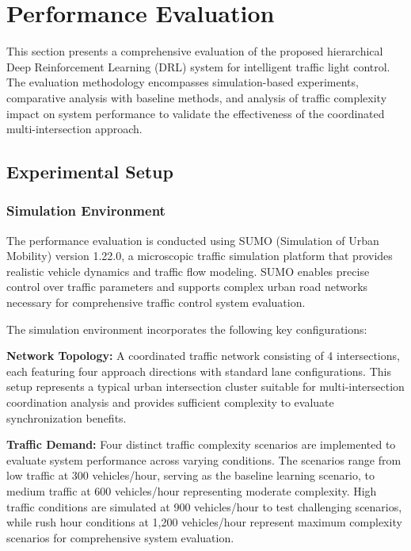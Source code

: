 \section{Performance Evaluation}\label{sec2b}

This section presents a comprehensive evaluation of the proposed hierarchical Deep Reinforcement Learning (DRL) system for intelligent traffic light control. The evaluation methodology encompasses simulation-based experiments, comparative analysis with baseline methods, and analysis of traffic complexity impact on system performance to validate the effectiveness of the coordinated multi-intersection approach.

\subsection{Experimental Setup}\label{subsec2b-1}

\subsubsection{Simulation Environment}

The performance evaluation is conducted using SUMO (Simulation of Urban Mobility) version 1.22.0, a microscopic traffic simulation platform that provides realistic vehicle dynamics and traffic flow modeling. SUMO enables precise control over traffic parameters and supports complex urban road networks necessary for comprehensive traffic control system evaluation.

The simulation environment incorporates the following key configurations:

\textbf{Network Topology:} A coordinated traffic network consisting of 4 intersections, each featuring four approach directions with standard lane configurations. This setup represents a typical urban intersection cluster suitable for multi-intersection coordination analysis and provides sufficient complexity to evaluate synchronization benefits.

\textbf{Traffic Demand:} Four distinct traffic complexity scenarios are implemented to evaluate system performance across varying conditions. The scenarios range from low traffic at 300 vehicles/hour, serving as the baseline learning scenario, to medium traffic at 600 vehicles/hour representing moderate complexity. High traffic conditions are simulated at 900 vehicles/hour to test challenging scenarios, while rush hour conditions at 1,200 vehicles/hour represent maximum complexity scenarios for comprehensive system evaluation.

